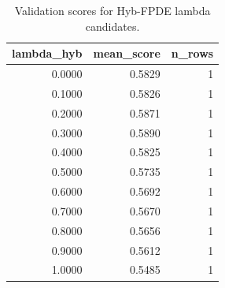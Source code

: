 \begin{table}[t]
\caption{Validation scores for Hyb-FPDE lambda candidates.}
\label{tab:lambda_distribution_computed}
\centering
\begin{tabular}{rrr}
\toprule
lambda\_hyb & mean\_score & n\_rows \\
\midrule
0.0000 & 0.5829 & 1 \\
0.1000 & 0.5826 & 1 \\
0.2000 & 0.5871 & 1 \\
0.3000 & 0.5890 & 1 \\
0.4000 & 0.5825 & 1 \\
0.5000 & 0.5735 & 1 \\
0.6000 & 0.5692 & 1 \\
0.7000 & 0.5670 & 1 \\
0.8000 & 0.5656 & 1 \\
0.9000 & 0.5612 & 1 \\
1.0000 & 0.5485 & 1 \\
\bottomrule
\end{tabular}

\end{table}
